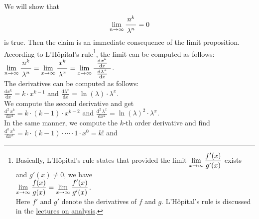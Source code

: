 \proof  We will show that 
\hspace*{1.3cm} 
\begin{equation}
  \label{eq:star}
  \lim\limits_{n \rightarrow \infty} \bruch{n^{k}}{\lambda^n} = 0  
\end{equation}
is true.  Then the claim is an immediate consequence of the limit proposition. 
According to \href{https://de.wikipedia.org/wiki/Regel_von_de_L%27Hospital}{L'H\^opital's rule}\footnote{Basically, L'H\^opital's rule states that provided the
  limit $\displaystyle \lim\limits_{x \rightarrow \infty} \frac{f'(x)}{g'(x)}$ exists and $g'(x) \not= 0$, we have
  \\
  \hspace*{1.3cm}
  $\displaystyle\lim\limits_{x \rightarrow \infty} \frac{f(x)}{g(x)} = \lim\limits_{x \rightarrow \infty} \frac{f'(x)}{g'(x)}$.
  \\[0.2cm]
  Here $f'$ and $g'$ denote the derivatives of $f$ and $g$. 
  L'H\^opital's rule is discussed in the \href{https://github.com/karlstroetmann/Analysis/blob/master/Skript/analysis.pdf}{lectures on analysis}.
},  
the limit can be computed as follows: \\[0.2cm]
\hspace*{1.3cm} 
$\displaystyle \lim\limits_{n \rightarrow \infty} \bruch{n^{k}}{\lambda^n} =
\lim\limits_{x \rightarrow \infty} \bruch{x^{k}}{\lambda^x} =
\lim\limits_{x \rightarrow \infty} \bruch{\;\frac{\mathrm{d}x^{k}}{\mathrm{d}x}\;}{\frac{\mathrm{d}\lambda^x}{\mathrm{d}x}}$.
\\[0.2cm]
The derivatives can be computed as follows: \\[0.2cm]
\hspace*{1.3cm}
 $\displaystyle \frac{\mathrm{d}x^{k}}{\mathrm{d}x} = k \cdot x^{k-1}$ \quad and \quad 
 $\displaystyle \frac{\mathrm{d}\lambda^{x}}{\mathrm{d}x} = \ln(\lambda) \cdot \lambda^x$. \\[0.2cm]
We compute the second derivative and get \\[0.2cm]
\hspace*{1.3cm}  
$\displaystyle \frac{\mathrm{d}^{2}\,x^{k}}{\mathrm{d}x^2} = k \cdot (k-1) \cdot x^{k-2}$ \quad and \quad 
 $\displaystyle \frac{\mathrm{d}^2\,\lambda^{x}}{\mathrm{d}x^2} = \ln(\lambda)^2 \cdot \lambda^x$. \\[0.2cm]
In the same manner, we compute the $k$-th order derivative and find \\[0.2cm]
\hspace*{1.3cm} 
$\displaystyle \frac{\mathrm{d}^{k}\,x^{k}}{\mathrm{d}x^k} = k \cdot (k-1) \cdot \cdots \cdot 1 \cdot x^{0} = k!$ \quad and \quad 
